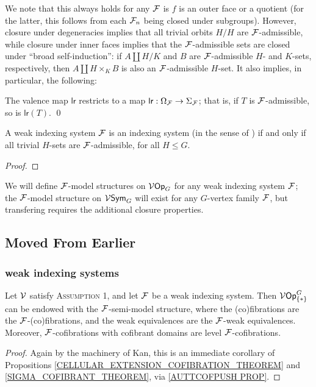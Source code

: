 \documentclass[a4paper,10pt]{article}%
\begin{document}
We note that this always holds for any $\mathcal F$ is $f$ is an outer face or a quotient (for the latter, this follows from each $\mathcal F_n$ being closed under subgroups). However, closure under degeneracies implies that all trivial orbits $H/H$ are $\mathcal F$-admissible, while closure under inner faces implies that the $\mathcal F$-admissible sets are closed under  ``broad self-induction'': if $A \amalg H/K$ and $B$ are $\mathcal F$-admissible $H$- and $K$-sets, respectively, then $A \amalg H\times_K B$ is also an $\mathcal F$-admissible $H$-set. It also implies, in particular, the following:
\begin{lemma}
  \label{WEAK_INDEXING_VALENCE_LEMMA}
  The valence map $\mathsf{lr}$ restricts to a map $\mathsf{lr}: \Omega_{\mathcal F} \to \Sigma_{\mathcal F}$; that is, if $T$ is $\mathcal F$-admissible, so is $\mathsf{lr}(T)$. \qed
\end{lemma}


\begin{lemma}
  A weak indexing system $\mathcal F$ is an indexing system (in the sense of \cite{BH15}) if and only if all trivial $H$-sets are $\mathcal F$-admissible, for all $H\leq G$.
\end{lemma}
\begin{proof}
\end{proof}

We will define $\mathcal F$-model structures on $\mathcal V\mathsf{Op}_G$ for any weak indexing system $\mathcal F$; the $\mathcal F$-model structure on $\mathcal V\mathsf{Sym}_G$ will exist for any $G$-vertex family $\mathcal F$, but transfering requires the additional closure properties.


\subsection{Moved From Earlier}


\subsubsection{weak indexing systems}

\begin{theorem}
  \label{G_OP_SEMI_THEOREM}
  Let $\mathcal V$ satisfy \textsc{Assumption 1}, and let $\mathcal F$ be a weak indexing system. Then $\mathcal V\mathsf{Op}^G_{\left\{*\right\}}$ can be endowed with the $\mathcal F$-semi-model structure, where the (co)fibrations are the $\mathcal F$-(co)fibrations, and the weak equivalences are the $\mathcal F$-weak equivalences. Moreover, $\mathcal F$-cofibrations with cofibrant domains are level $\mathcal F$-cofibrations.
\end{theorem}
\begin{proof}
  Again by the machinery of Kan, this is an immediate corollary of Propositions \ref{CELLULAR_EXTENSION_COFIBRATION_THEOREM} and \ref{SIGMA_COFIBRANT_THEOREM}, via \ref{AUTTCOFPUSH PROP}.
\end{proof}
\end{document}
